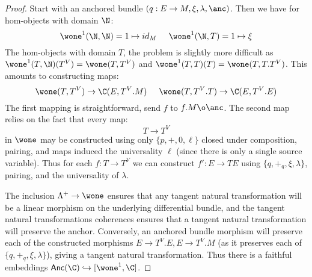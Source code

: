 \begin{proof}
    Start with an anchored bundle $(q:E \to M, \xi, \lambda, \anc)$. Then we have for hom-objects with domain $\N$:
    \[
        \wone^1(\N,\N) = 1 \mapsto id_M \hspace{0.5cm} \wone^1(\N,T) = 1 \mapsto \xi
    \]
    The hom-objects with domain $T$, the problem is slightly more difficult as $\wone^1(T,\N)(T^V) = \wone(T, T^V)$ and $\wone^1(T, T)(T) = \wone(T, T.T^V)$.
    This amounts to constructing maps:
    \[
         \wone(T, T^V) \to \C(E, T^V.M) \hspace{0.5cm}  \wone(T,T^V.T) \to \C(E, T^V.E)
    \]
    The first mapping is straightforward, send $f$ to $f.M \o \anc$. The second map relies on the fact that every map:
    \[
        T \to T^V
    \]
    in $\wone$ may be constructed using only $\{p,+,0,\ell\}$ closed under composition, pairing, and maps induced the universality $\ell$ (since there is only a single source variable).
    Thus for each $f:T \to T^V$ we can construct $f':E \to TE$ using $\{ q, +_q, \xi, \lambda\}$, pairing, and the universality of $\lambda$.

    The inclusion $\Lambda^+ \to \wone$ ensures that any tangent natural transformation will be a linear morphism on the underlying differential bundle, and the tangent natural transformations coherences ensures that a tangent natural transformation will preserve the anchor.
    Conversely, an anchored bundle morphism will preserve each of the constructed morphisms $E \to T^V.E, E \to T^V.M$ (as it preserves each of $\{ q, +_q, \xi, \lambda\}$), giving a tangent natural transformation. Thus there is a faithful embeddings $\mathsf{Anc}(\C) \hookrightarrow [\wone^1, \C]$.
\end{proof}

